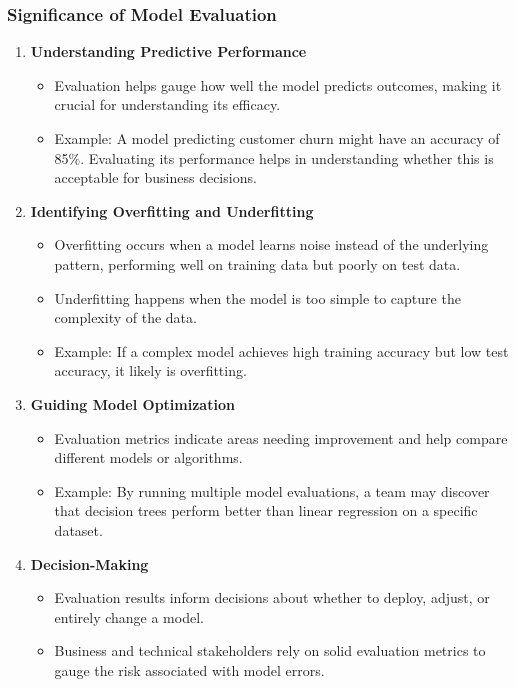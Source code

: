 \documentclass{beamer}
\begin{document}
\begin{frame}[fragile]
    \frametitle{Significance of Model Evaluation}
    \begin{enumerate}
        \item \textbf{Understanding Predictive Performance}
            \begin{itemize}
                \item Evaluation helps gauge how well the model predicts outcomes, making it crucial for understanding its efficacy.
                \item Example: A model predicting customer churn might have an accuracy of 85\%. Evaluating its performance helps in understanding whether this is acceptable for business decisions.
            \end{itemize}
        \item \textbf{Identifying Overfitting and Underfitting}
            \begin{itemize}
                \item Overfitting occurs when a model learns noise instead of the underlying pattern, performing well on training data but poorly on test data.
                \item Underfitting happens when the model is too simple to capture the complexity of the data.
                \item Example: If a complex model achieves high training accuracy but low test accuracy, it likely is overfitting.
            \end{itemize}
        \item \textbf{Guiding Model Optimization}
            \begin{itemize}
                \item Evaluation metrics indicate areas needing improvement and help compare different models or algorithms.
                \item Example: By running multiple model evaluations, a team may discover that decision trees perform better than linear regression on a specific dataset.
            \end{itemize}
        \item \textbf{Decision-Making}
            \begin{itemize}
                \item Evaluation results inform decisions about whether to deploy, adjust, or entirely change a model.
                \item Business and technical stakeholders rely on solid evaluation metrics to gauge the risk associated with model errors.
            \end{itemize}
    \end{enumerate}
\end{frame}
\end{document}
